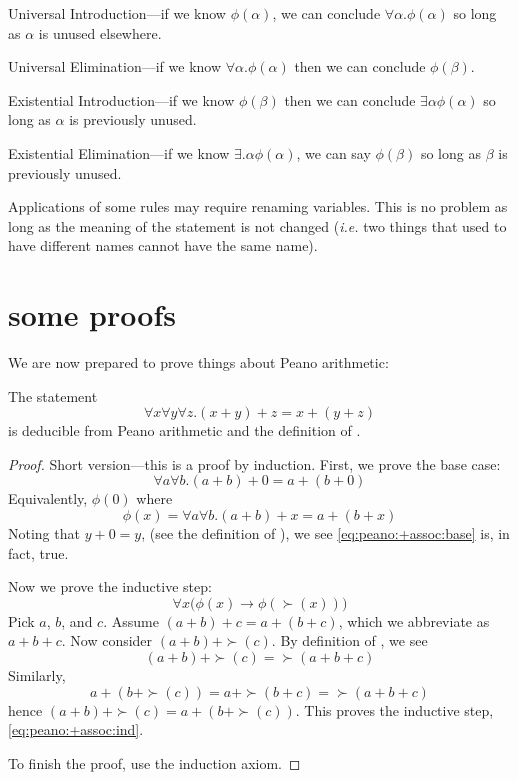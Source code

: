 \documentclass{scrbook}
\renewcommand{\implies}{\to}
\newcommand{\ie}{\emph{i.e.}\xspace}
\begin{document}
 
\begin{trivlist}
\item Universal Introduction---if we know $\phi(\alpha)$, we can conclude $\forall \alpha . \phi(\alpha)$ so long as $\alpha$ is unused elsewhere.
\item Universal Elimination---if we know $\forall \alpha . \phi(\alpha)$ then we can conclude $\phi(\beta)$. 
\item Existential Introduction---if we know $\phi(\beta)$ then we can conclude $\exists \alpha \phi(\alpha)$ so long as $\alpha$ is previously unused.
\item Existential Elimination---if we know $\exists. \alpha \phi(\alpha)$, we can say $\phi(\beta)$ so long as $\beta$ is previously unused. 
\end{trivlist}
Applications of some rules may require renaming variables. This is no problem as long as the meaning of the statement is not changed (\ie two things that used to have different names cannot have the same name). 

\section[Some Proofs]{some proofs}
We are now prepared to prove things about Peano arithmetic:

\begin{theorem}[$+$ is associative]
  The statement 
  \[
  \forall x \forall y \forall z . (x+y)+z = x+(y+z)
  \]
  is deducible from Peano arithmetic and the definition of .
\end{theorem}
\begin{proof}
  Short version---this is a proof by induction. First, we prove the base case:
   \begin{equation}
    \label{eq:peano:+assoc:base}
    \forall a \forall b .  (a+b) + 0 = a+(b+0)
  \end{equation}
  Equivalently, $\phi(0)$ where
  \[
  \phi(x) = \forall a \forall b . (a+b)+x = a+(b+x)
  \]
  Noting that $y+0=y$, (see the definition of  ), we 
  see \cref{eq:peano:+assoc:base} is, in fact, true. 
 
  Now we prove the inductive step: 
  \begin{equation}
    \label{eq:peano:+assoc:ind}
    \forall x \bigl(\phi(x)\implies \phi(\succ(x))\bigr)   
  \end{equation}
  Pick $a$, $b$, and $c$. 
  Assume $(a+b)+c = a+(b+c)$, which we abbreviate as $a+b+c$. Now consider $(a+b)+\succ(c)$. By definition of , we see \[(a+b)+\succ(c)=\succ(a+b+c)\] Similarly, \[a+(b+\succ(c))=a+\succ(b+c)=\succ(a+b+c)\]
  hence $(a+b)+\succ(c)=a+(b+\succ(c))$. This proves the inductive step, \cref{eq:peano:+assoc:ind}.
  
  To finish the proof, use the induction axiom. 
\end{proof}
\end{document}
